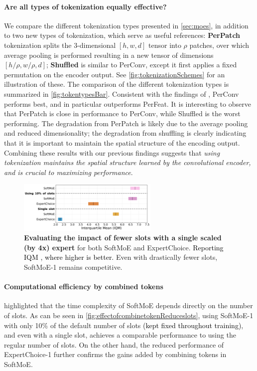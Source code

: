 \documentclass{article} %
\newcommand{\rebuttal}[1]{\textcolor{black}{#1}}
\begin{document}
\paragraph{Are all types of tokenization equally effective?} We compare the different tokenization types presented in \cref{sec:moes}, in addition to two new types of tokenization, which serve as useful references: {\bf PerPatch} tokenization splits the 3-dimensional $[h,w,d]$ tensor into $\rho$ patches, over which average pooling is performed resulting in a new tensor of dimensions $[h/\rho, w/\rho, d]$; {\bf Shuffled} is similar to PerConv, except it first applies a fixed permutation on the encoder output. See \autoref{fig:tokenizationSchemes} for an illustration of these. The comparison of the different tokenization types is summarized in \autoref{fig:tokentypesBar}. Consistent with the findings of \citet{ceron2024mixtures}, PerConv performs best, and in particular outperforms PerFeat. It is interesting to observe that PerPatch is close in performance to PerConv, while Shuffled is the worst performing. The degradation from PerPatch is likely due to the average pooling and reduced dimensionality; the degradation from shuffling is clearly indicating that it is important to maintain the spatial structure of the encoding output. Combining these results with our previous findings suggests that {\em using tokenization maintains the spatial structure learned by the convolutional encoder, and is crucial to maximizing performance}. 


\begin{figure}[!b]
    \centering
    \includegraphics[width=0.6\textwidth]{figures/results/reduced_slots_per_experts.pdf}
    \caption{{\bf Evaluating the impact of fewer slots with a single scaled (by 4x) expert}  for both SoftMoE and ExpertChoice. \rebuttal{Reporting IQM \citep{agarwal2021deep}, where higher is better.} Even with drastically fewer slots, SoftMoE-1 remains competitive.}
    \label{fig:effectofcombinetokenReduceslots}
\end{figure}

\paragraph{Computational efficiency by combined tokens} \citet{puigcerver2024from} highlighted that the time complexity of SoftMoE depends directly on the number of slots. As can be seen in \autoref{fig:effectofcombinetokenReduceslots}, using SoftMoE-1 with only 10\% of the default number of slots \rebuttal{(kept fixed throughout training)}, and even with a single slot, achieves a comparable performance to using the regular number of slots. On the other hand, the reduced performance of ExpertChoice-1 further confirms the gains added by combining tokens in SoftMoE. 
\end{document}
